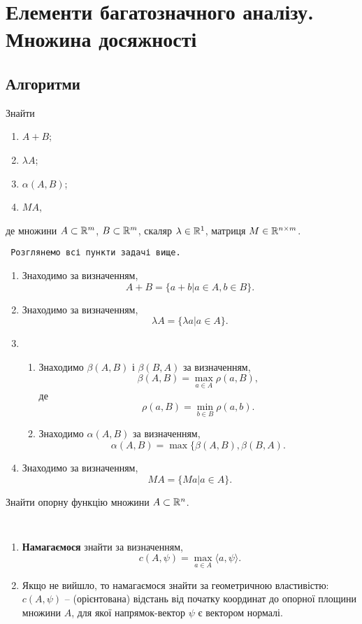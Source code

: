 \section{Елементи багатозначного аналізу. Множина досяжності}

\subsection{Алгоритми}

\begin{problem*}
	Знайти
	\begin{enumerate}
		\item $A+B$;
		\item $\lambda A$;
		\item $\alpha(A,B)$;
		\item $MA$,
	\end{enumerate}
	де множини $A \subset\mathbb{R}^m$, $B\subset\mathbb{R}^m$, скаляр $\lambda\in\mathbb{R}^1$, матриця $M\in\mathbb{R}^{n\times m}$.
\end{problem*}

\begin{algorithm} \tt
	Розглянемо всі пункти задачі вище.
	\begin{enumerate}
		\item Знаходимо за визначенням, \[A+B=\{a+b|a\in A,b\in B\}.\]
		\item Знаходимо за визначенням, \[\lambda A =\{\lambda a|a\in A\}.\] 
		\item \begin{enumerate}
			\item Знаходимо $\beta(A,B)$ і $\beta(B,A)$ за визначенням, \[ \beta(A,B) = \max_{a\in A}\rho(a,B), \]
			де \[\rho(a,B) = \min_{b\in B} \rho(a,b).\]
			\item Знаходимо $\alpha(A,B)$ за визначенням, \[\alpha(A,B)=\max\{\beta(A,B),\beta(B,A).\]
		\end{enumerate} 
		\item Знаходимо за визначенням, \[MA=\{Ma|a\in A\}.\]
	\end{enumerate}
\end{algorithm}

\begin{problem*}
	Знайти опорну функцію множини $A \subset \mathbb{R}^n$.
\end{problem*}

\begin{algorithm} \tt
	\begin{enumerate}
		\item \textbf{Намагаємося} знайти за визначенням, \[ c(A,\psi) = \max_{a\in A} \langle a, \psi \rangle. \]
		\item Якщо не вийшло, то намагаємося знайти за геометричною властивістю: $c(A,\psi)$ -- (орієнтована) відстань від початку координат до опорної \allowbreak пло\-щи\-ни множини $A$, для якої напрямок-вектор $\psi$ є вектором нормалі.
	\end{enumerate}
\end{algorithm}

